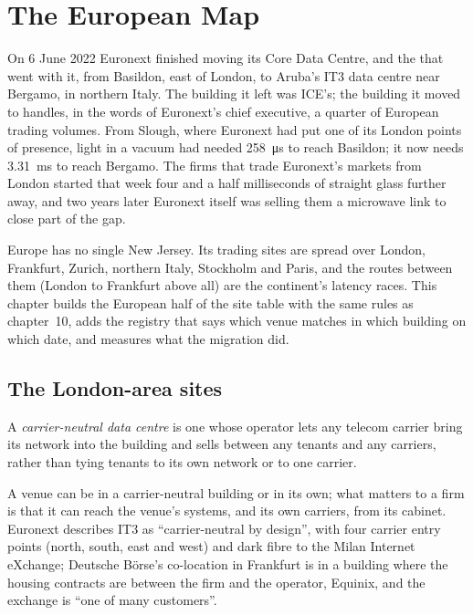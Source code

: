 \chapter{The European Map}\label{ch:nw:the-european-map}

On 6 June 2022 Euronext finished moving its Core Data Centre, and the  that went with it, from Basildon, east of London, to
Aruba's IT3 data centre near Bergamo, in northern Italy. The building it left was ICE's; the building it moved to handles, in the words
of Euronext's chief executive, a quarter of European trading volumes. From Slough, where Euronext had put one of its London points
of presence, light in a vacuum had needed \qty{258}{\micro\second} to reach Basildon; it now needs
\qty{3.31}{\milli\second} to reach Bergamo. The firms that trade Euronext's markets from London started that week four and a half
milliseconds of straight glass further away, and two years later Euronext itself was selling them a microwave link to close part of the gap.

Europe has no single New Jersey. Its trading sites are spread over London, Frankfurt, Zurich, northern Italy, Stockholm and Paris, and the
routes between them (London to Frankfurt above all) are the continent's latency races. This chapter builds the European half of the site
table with the same rules as chapter~10, adds the registry that says which venue matches in which building on which date, and measures what
the migration did.

\section{The London-area sites}

\begin{definition}\label{def:nw:the-european-map:neutral}
A \emph{carrier-neutral data centre} is one whose operator lets any telecom carrier bring its network into
the building and sells  between any tenants and any carriers, rather than tying tenants to its own network or to one carrier.
\end{definition}

A venue can be in a carrier-neutral building or in its own; what matters to a firm is that it can reach the venue's systems, and its own
carriers, from its cabinet. Euronext describes IT3 as ``carrier-neutral by design'', with four carrier entry points (north, south, east and
west) and dark fibre to the Milan Internet eXchange; Deutsche Börse's co-location in Frankfurt is in a building where the housing contracts
are between the firm and the operator, Equinix, and the exchange is ``one of many customers''.

